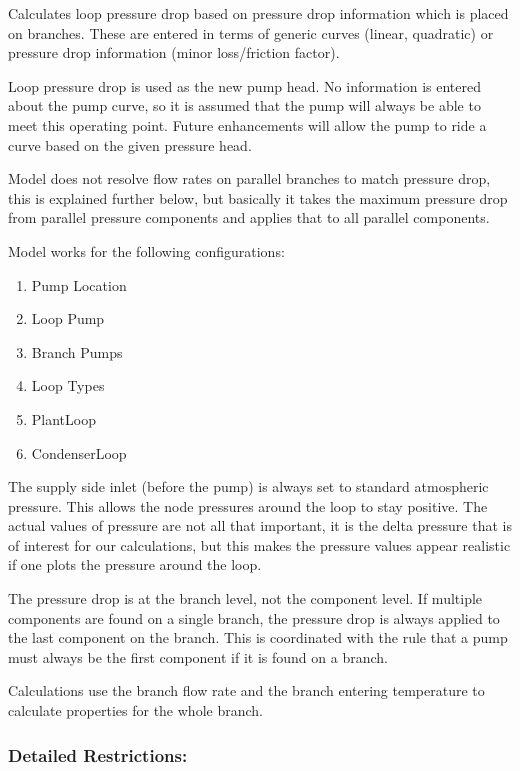 Calculates loop pressure drop based on pressure drop information which is placed on branches. These are entered in terms of generic curves (linear, quadratic) or pressure drop information (minor loss/friction factor).

Loop pressure drop is used as the new pump head. No information is entered about the pump curve, so it is assumed that the pump will always be able to meet this operating point. Future enhancements will allow the pump to ride a curve based on the given pressure head.

Model does not resolve flow rates on parallel branches to match pressure drop, this is explained further below, but basically it takes the maximum pressure drop from parallel pressure components and applies that to all parallel components.

Model works for the following configurations:

\begin{enumerate}
\def\labelenumi{\arabic{enumi}.}
\item
  Pump Location
\item
  Loop Pump
\item
  Branch Pumps
\item
  Loop Types
\item
  PlantLoop
\item
  CondenserLoop
\end{enumerate}

The supply side inlet (before the pump) is always set to standard atmospheric pressure. This allows the node pressures around the loop to stay positive. The actual values of pressure are not all that important, it is the delta pressure that is of interest for our calculations, but this makes the pressure values appear realistic if one plots the pressure around the loop.

The pressure drop is at the branch level, not the component level. If multiple components are found on a single branch, the pressure drop is always applied to the last component on the branch. This is coordinated with the rule that a pump must always be the first component if it is found on a branch.

Calculations use the branch flow rate and the branch entering temperature to calculate properties for the whole branch.

\subsubsection{Detailed Restrictions:}\label{detailed-restrictions}

